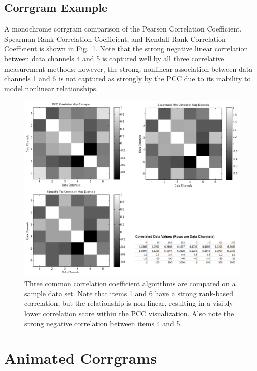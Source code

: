 \subsection{Corrgram Example}

A monochrome corrgram comparison of the Pearson Correlation Coefficient, Spearman Rank Correlation Coefficient, and Kendall Rank Correlation Coefficient is shown in Fig.~\ref{fig:correlation_comparison}. Note that the strong negative linear correlation between data channels 4 and 5 is captured well by all three correlative measurement methods; however, the strong, nonlinear association between data channels 1 and 6 is not captured as strongly by the PCC due to its inability to model nonlinear relationships.

\begin{figure}[h]
\centering
    \includegraphics[width=\columnwidth]{images/correlation_comparison.png}
    \caption{Three common correlation coefficient algorithms are compared on a sample data set. Note that items 1 and 6 have a strong rank-based correlation, but the relationship is non-linear, resulting in a visibly lower correlation score within the PCC visualization. Also note the strong negative correlation between items 4 and 5.}
    \label{fig:correlation_comparison}
\end{figure}

\section{Animated Corrgrams}

